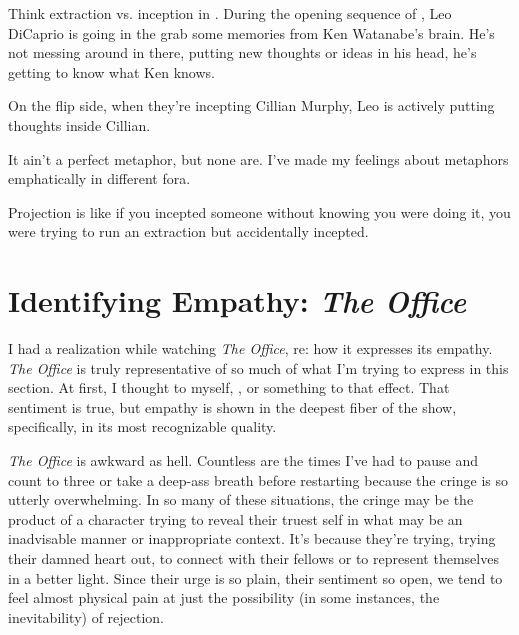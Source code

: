 \documentclass[../butidigress.tex]{subfiles}
\begin{document}
Think extraction vs. inception in .
During the opening sequence of , Leo DiCaprio is going in the grab some memories from Ken Watanabe's brain.
He's not messing around in there, putting new thoughts or ideas in his head, he's getting to know what Ken knows.

On the flip side, when they're incepting Cillian Murphy, Leo is actively putting thoughts inside Cillian.

It ain't a perfect metaphor, but none are. I've made my feelings about metaphors emphatically in different fora.

Projection is like if you incepted someone without knowing you were doing it, you were trying to run an extraction but accidentally incepted.

\section{Identifying Empathy: \textit{The Office}}\label{sec:theoffice}
I had a realization while watching \textit{The Office}, re: how it expresses its empathy.
\textit{The Office} is truly representative of so much of what I'm trying to express in this section.
At first, I thought to myself, , or something to that effect.
That sentiment is true, but empathy is shown in the deepest fiber of the show, specifically, in its most recognizable quality.

\textit{The Office} is awkward as hell.
Countless are the times I've had to pause and count to three or take a deep-ass breath before restarting because the cringe is so utterly overwhelming.
In so many of these situations, the cringe may be the product of a character trying to reveal their truest self in what may be an inadvisable manner or inappropriate context.
It's because they're trying, trying their damned heart out, to connect with their fellows or to represent themselves in a better light.
Since their urge is so plain, their sentiment so open, we tend to feel almost physical pain at just the possibility (in some instances, the inevitability) of rejection.
\end{document}
